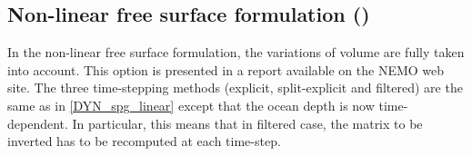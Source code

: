 \documentclass[../main/NEMO_manual]{subfiles}
\begin{document}
\subsection{Non-linear free surface formulation (\protect{})}
\label{subsec:DYN_spg_vvl}

In the non-linear free surface formulation, the variations of volume are fully taken into account.
This option is presented in a report \citep{Levier2007} available on the NEMO web site.
The three time-stepping methods (explicit, split-explicit and filtered) are the same as in
\autoref{DYN_spg_linear} except that the ocean depth is now time-dependent.
In particular, this means that in filtered case, the matrix to be inverted has to be recomputed at each time-step.

\biblio

\pindex
\end{document}
